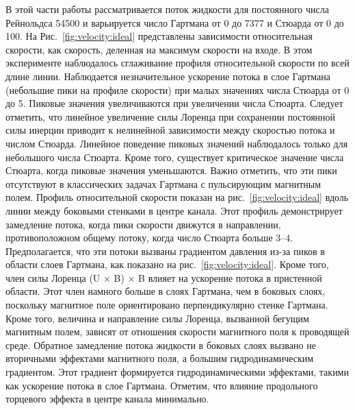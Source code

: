 В этой части работы рассматривается поток жидкости для постоянного числа Рейнольдса 54500 и варьируется число Гартмана от 0 до 7377 и Стюарда от 0 до 100. На Рис.~\ref{fig:velocity:ideal} представлены зависимости относительная скорости, как скорость, деленная на максимум скорости на входе. В этом эксперименте наблюдалось сглаживание профиля относительной скорости по всей длине линии. Наблюдается незначительное ускорение потока в слое Гартмана (небольшие пики на профиле скорости) при малых значениях числа Стюарда от 0 до 5. Пиковые значения увеличиваются при увеличении числа Стюарта. Следует отметить, что линейное увеличение силы Лоренца при сохранении постоянной силы инерции приводит к нелинейной зависимости между скоростью потока и числом Стюарда. Линейное поведение пиковых значений наблюдалось только для небольшого числа Стюарта. Кроме того, существует критическое значение числа Стюарта, когда пиковые значения уменьшаются. Важно отметить, что эти пики отсутствуют в классических задачах Гартмана с пульсирующим магнитным полем. Профиль относительной скорости показан на рис.~\ref{fig:velocity:ideal} вдоль линии между боковыми стенками в центре канала. Этот профиль демонстрирует замедление потока, когда пики скорости движутся в направлении, противоположном общему потоку, когда число Стюарта больше 3–4. Предполагается, что эти потоки вызваны градиентом давления из-за пиков в области слоев Гартмана, как показано на рис.~\ref{fig:velocity:ideal}. Кроме того, член силы Лоренца (U × B) × B влияет на ускорение потока в пристенной области. Этот член намного больше в слоях Гартмана, чем в боковых слоях, поскольку магнитное поле ориентировано перпендикулярно стенке Гартмана. Кроме того, величина и направление силы Лоренца, вызванной бегущим магнитным полем, зависят от отношения скорости магнитного поля к проводящей среде. Обратное замедление потока жидкости в боковых слоях вызвано не вторичными эффектами магнитного поля, а большим гидродинамическим градиентом. Этот градиент формируется гидродинамическими эффектами, такими как ускорение потока в слое Гартмана. Отметим, что влияние продольного торцевого эффекта в центре канала минимально. 

